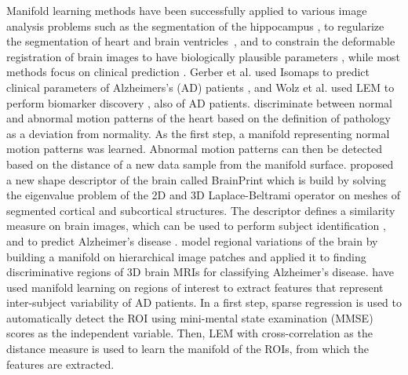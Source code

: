 Manifold learning methods have been successfully applied to various image
analysis problems such as the segmentation of the hippocampus \citep{wolz2010},
to regularize the segmentation of heart \citep{zhang2006} and brain
ventricles~\citep{etyngier2007}, and to constrain the deformable registration of
brain images to have biologically plausible parameters \citep{hamm2010}, while
most methods focus on clinical prediction
\citep{gerber2010,wolz2012,duchateau2012,aljabar2011,wachinger2015,bhatia2012,
guerrero2014}. Gerber et al. used Isomaps to predict clinical parameters of
Alzheimers's (AD) patients \citep{gerber2009,gerber2010}, and Wolz et al. used
LEM to perform biomarker discovery \citep{wolz2011,wolz2012}, also of AD
patients. \citet{duchateau2011,duchateau2012} discriminate between normal and
abnormal motion patterns of the heart based on the definition of pathology as a
deviation from normality. As the first step, a manifold representing normal
motion patterns was learned. Abnormal motion patterns can then be detected based
on the distance of a new data sample from the manifold surface.
\citet{wachinger2015} proposed a new shape descriptor of the brain called
BrainPrint which is build by solving the eigenvalue problem of the 2D and 3D
Laplace-Beltrami operator on meshes of segmented cortical and subcortical
structures. The descriptor defines a similarity measure on brain images, which
can be used to perform subject identification \citep{wachinger2014a}, and to
predict Alzheimer's disease \citep{wachinger2014b}.
\citet{bhatia2012} model regional variations of the brain by building a manifold
on hierarchical image patches and applied it to finding discriminative regions
of 3D brain MRIs for classifying Alzheimer's disease.
\citet{guerrero2014} have used manifold learning on regions of interest to
extract features that represent inter-subject variability of AD patients.
In a first step, sparse regression is used to automatically detect the ROI using
mini-mental state examination (MMSE) scores as the independent variable. Then,
LEM with cross-correlation as the distance measure is used to learn the manifold
of the ROIs, from which the features are extracted.

